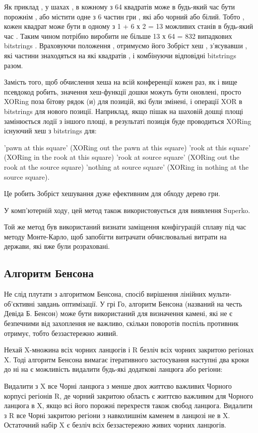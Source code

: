 Як приклад , у шахах , в кожному з 64 квадратів може в будь-який час бути порожнім , або містити одне з 6 частин гри , які або чорний або білий. Тобто , кожен квадрат може бути в одному з 1 + 6 х 2 = 13 можливих станів в будь-який час . Таким чином потрібно виробити не більше 13 х 64 = 832 випадкових bitstrings . Враховуючи положення , отримуємо його Зобріст хеш , з'ясувавши , які частини знаходяться на які квадратів , і комбінуючи відповідні bitstrings разом.

Замість того, щоб обчислення хеша на всій конференції кожен раз, як і вище псевдокод робить, значення хеш-функції дошки можуть бути оновлені, просто XORing поза бітову рядок (и) для позицій, які були змінені, і операції XOR в bitstrings для нового позиції. Наприклад, якщо пішак на шаховій дошці площі замінюється лодії з іншого площі, в результаті позиція буде проводиться XORing існуючий хеш з bitstrings для:

'pawn at this square' (XORing out the pawn at this square) 'rook at this square' (XORing in the rook at this square) 'rook at source square' (XORing out the rook at the source square) 'nothing at source square' (XORing in nothing at the source square).

Це робить Зобріст хешування дуже ефективним для обходу дерево гри. 

У комп'ютерній ходу, цей метод також використовується для виявлення Superko.

Той же метод був використаний визнати заміщення конфігурацій сплаву під час методу Монте-Карло, щоб запобігти витрачати обчислювальні витрати на держави, які вже були розраховані.
\subsection{Алгоритм Бенсона}
Не слід плутати з алгоритмом Бенсона, спосіб вирішення лінійних мульти-об'єктивні завдань оптимізації. У грі Го, алгоритм Бенсона (названий на честь Девіда Б. Бенсон) може бути використаний для визначення камені, які не є безпечними від захоплення не важливо, скільки поворотів поспіль противник отримує, тобто беззастережно живий.

Нехай X-множина всіх чорних ланцюгів і R безліч всіх чорних закритою регіонах X. Тоді алгоритм Бенсона вимагає ітеративного застосування наступні два кроки до ні на є можливість видалити будь-які додаткові ланцюга або регіони: 

Видалити з X все Чорні ланцюга з менше двох життєво важливих Чорного корпусі регіонів R, де чорний закритою область є життєво важливим для Чорного ланцюга в X, якщо всі його порожні перехрестя також свобод ланцюга. Видалити з R все Чорні закритою регіони з навколишнім каменем в ланцюзі не в X. Остаточний набір X є безліч всіх беззастережно живих чорних ланцюгів.

